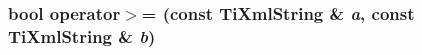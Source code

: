 \subsubsection[operator$>$=]{\setlength{\rightskip}{0pt plus 5cm}bool operator$>$= (const {\bf TiXmlString} \& {\em a}, \/  const {\bf TiXmlString} \& {\em b})\hspace{0.3cm}{\tt  [inline]}}\label{tinystr_8h_d5a4ecbced1596c900ac7d7a51660357}


